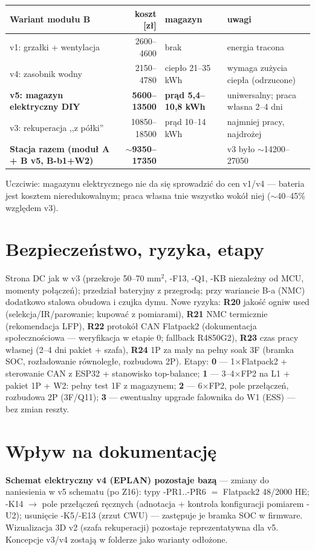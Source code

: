 \documentclass[11pt,a4paper]{article}
\begin{document}
\begin{longtable}{@{}p{}rp{}p{}@{}}
\toprule
\textbf{Wariant modułu B} & \textbf{koszt [zł]} & \textbf{magazyn} & \textbf{uwagi}\\
\midrule
v1: grzałki + wentylacja & 2600--4600 & brak & energia tracona\\
v4: zasobnik wodny & 2150--4780 & ciepło 21--35 kWh & wymaga zużycia ciepła (odrzucone)\\
\textbf{v5: magazyn elektryczny DIY} & \textbf{5600--13500} & \textbf{prąd 5,4--10,8 kWh} & uniwersalny; praca własna 2--4 dni\\
v3: rekuperacja ,,z półki'' & 10850--18500 & prąd 10--14 kWh & najmniej pracy, najdrożej\\
\midrule
\textbf{Stacja razem (moduł A + B v5, B-b1+W2)} & \textbf{$\sim$9350--17350} & & v3 było $\sim$14200--27050\\
\bottomrule
\end{longtable}
Uczciwie: magazynu elektrycznego nie da się sprowadzić do cen v1/v4 --- bateria jest kosztem
nieredukowalnym; praca własna tnie wszystko wokół niej ($\sim$40--45\% względem v3).

\section{Bezpieczeństwo, ryzyka, etapy}
Strona DC jak w v3 (przekroje 50--70 mm$^2$, -F13, -Q1, -KB niezależny od MCU, momenty połączeń);
przedział bateryjny z przegrodą; przy wariancie B-a (NMC) dodatkowo stalowa obudowa i czujka dymu.
Nowe ryzyka: \textbf{R20} jakość ogniw used (selekcja/IR/parowanie; kupować z pomiarami),
\textbf{R21} NMC termicznie (rekomendacja LFP), \textbf{R22} protokół CAN Flatpack2
(dokumentacja społecznościowa --- weryfikacja w etapie 0; fallback R4850G2), \textbf{R23} czas
pracy własnej (2--4 dni pakiet + szafa), \textbf{R24} 1P za mały na pełny soak 3F (bramka SOC,
rozładowanie równoległe, rozbudowa 2P). Etapy: \textbf{0} --- 1$\times$Flatpack2 + sterowanie CAN
z ESP32 + stanowisko top-balance; \textbf{1} --- 3--4$\times$FP2 na L1 + pakiet 1P + W2: pełny
test 1F z magazynem; \textbf{2} --- 6$\times$FP2, pole przełączeń, rozbudowa 2P (3F/Q11);
\textbf{3} --- ewentualny upgrade falownika do W1 (ESS) --- bez zmian reszty.

\section{Wpływ na dokumentację}
\label{sec:dok}
\textbf{Schemat elektryczny v4 (EPLAN) pozostaje bazą} --- zmiany do naniesienia w v5 schematu
(po Z16): typy -PR1..-PR6 $=$ Flatpack2 48/2000 HE; -K14 $\to$ pole przełączeń ręcznych
(adnotacja + kontrola konfiguracji pomiarem -U2); usunięcie -K5/-E13 (zrzut CWU) --- zastępuje je
bramka SOC w firmware. Wizualizacja 3D v2 (szafa rekuperacji) pozostaje reprezentatywna dla v5.
Koncepcje v3/v4 zostają w folderze jako warianty odłożone.
\end{document}
